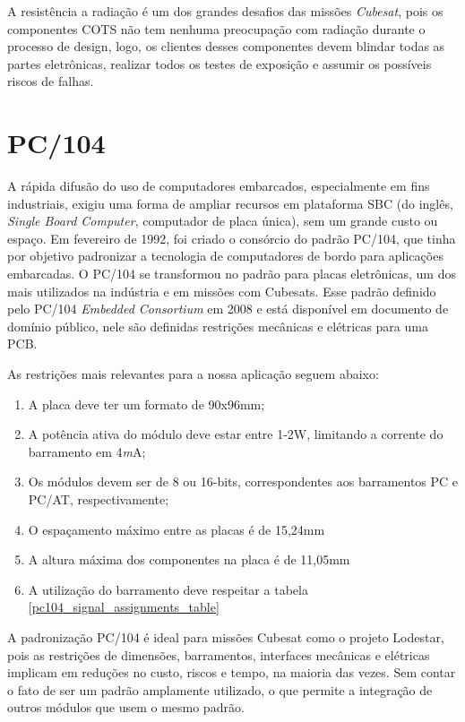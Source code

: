 A resistência a radiação é um dos grandes desafios das missões \textit{Cubesat}, pois os componentes COTS não tem nenhuma preocupação com radiação durante o processo de design, logo, os clientes desses componentes devem blindar todas as partes eletrônicas, realizar todos os testes de exposição e assumir os possíveis riscos de falhas.

\section{PC/104}\label{pc104_specs}
A rápida difusão do uso de computadores embarcados, especialmente em fins industriais, exigiu uma forma de ampliar recursos em plataforma SBC (do inglês, \textit{Single Board Computer}, computador de placa única), sem um grande custo ou espaço. Em fevereiro de 1992, foi criado o consórcio do padrão PC/104, que tinha por objetivo padronizar a tecnologia de computadores de bordo para aplicações embarcadas. O PC/104 se transformou no padrão para placas eletrônicas, um dos mais utilizados na indústria e em missões com Cubesats. Esse padrão definido pelo PC/104 \textit{Embedded Consortium} em 2008 e está disponível em documento de domínio público\cite{pc104_document}, nele são definidas restrições mecânicas e elétricas para uma PCB.

As restrições mais relevantes para a nossa aplicação seguem abaixo:

\begin{enumerate}
    \item A placa deve ter um formato de 90x96mm;
    \item A potência ativa do módulo deve estar entre 1-2W, limitando a corrente do barramento em 4\textit{m}A;
    \item Os módulos devem ser de 8 ou 16-bits, correspondentes aos barramentos PC e PC/AT, respectivamente;
    \item O espaçamento máximo entre as placas é de 15,24mm
    \item A altura máxima dos componentes na placa é de 11,05mm
    \item A utilização do barramento deve respeitar a tabela \ref{pc104_signal_assignments_table}
\end{enumerate}{}

A padronização PC/104 é ideal para missões Cubesat como o projeto Lodestar, pois as restrições de dimensões, barramentos, interfaces mecânicas e elétricas implicam em reduções no custo, riscos e tempo, na maioria das vezes. Sem contar o fato de ser um padrão amplamente utilizado, o que permite a integração de outros módulos que usem o mesmo padrão.

